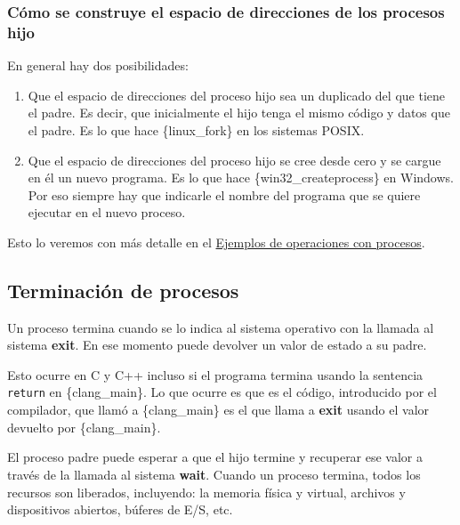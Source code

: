 \subsubsection{Cómo se construye el espacio de direcciones de los
procesos
hijo}\label{_como_se_construye_el_espacio_de_direcciones_de_los_procesos_hijo}

En general hay dos posibilidades:

\begin{enumerate}
\def\labelenumi{\arabic{enumi}.}
\item
  Que el espacio de direcciones del proceso hijo sea un duplicado del
  que tiene el padre. Es decir, que inicialmente el hijo tenga el mismo
  código y datos que el padre. Es lo que hace \{linux\_fork\} en los
  sistemas POSIX.
\item
  Que el espacio de direcciones del proceso hijo se cree desde cero y se
  cargue en él un nuevo programa. Es lo que hace
  \{win32\_createprocess\} en Windows. Por eso siempre hay que indicarle
  el nombre del programa que se quiere ejecutar en el nuevo proceso.
\end{enumerate}

Esto lo veremos con más detalle en el
\hyperref[_ejemplos_de_operaciones_con_procesos]{Ejemplos de operaciones
con procesos}.

\subsection{Terminación de procesos}\label{_terminacion_de_procesos}

Un proceso termina cuando se lo indica al sistema operativo con la
llamada al sistema \textbf{exit}. En ese momento puede devolver un valor
de estado a su padre.

Esto ocurre en C y C++ incluso si el programa termina usando la
sentencia \texttt{return} en \{clang\_main\}. Lo que ocurre es que es el
código, introducido por el compilador, que llamó a \{clang\_main\} es el
que llama a \textbf{exit} usando el valor devuelto por \{clang\_main\}.

El proceso padre puede esperar a que el hijo termine y recuperar ese
valor a través de la llamada al sistema \textbf{wait}. Cuando un proceso
termina, todos los recursos son liberados, incluyendo: la memoria física
y virtual, archivos y dispositivos abiertos, búferes de E/S, etc.

